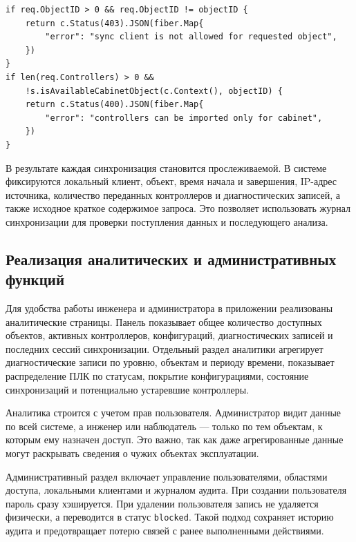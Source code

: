 \begin{samepage}
\begin{lstlisting}[caption={Фрагмент проверки локального клиента при импорте}, label={lst:chapter3_sync_check}]
if req.ObjectID > 0 && req.ObjectID != objectID {
    return c.Status(403).JSON(fiber.Map{
        "error": "sync client is not allowed for requested object",
    })
}
if len(req.Controllers) > 0 &&
    !s.isAvailableCabinetObject(c.Context(), objectID) {
    return c.Status(400).JSON(fiber.Map{
        "error": "controllers can be imported only for cabinet",
    })
}
\end{lstlisting}
\end{samepage}

В результате каждая синхронизация становится прослеживаемой. В системе фиксируются локальный клиент, объект, время начала и завершения, IP-адрес источника, количество переданных контроллеров и диагностических записей, а также исходное краткое содержимое запроса. Это позволяет использовать журнал синхронизации для проверки поступления данных и последующего анализа.


\subsection{Реализация аналитических и административных функций}

Для удобства работы инженера и администратора в приложении реализованы аналитические страницы. Панель показывает общее количество доступных объектов, активных контроллеров, конфигураций, диагностических записей и последних сессий синхронизации. Отдельный раздел аналитики агрегирует диагностические записи по уровню, объектам и периоду времени, показывает распределение ПЛК по статусам, покрытие конфигурациями, состояние синхронизаций и потенциально устаревшие контроллеры.

Аналитика строится с учетом прав пользователя. Администратор видит данные по всей системе, а инженер или наблюдатель --- только по тем объектам, к которым ему назначен доступ. Это важно, так как даже агрегированные данные могут раскрывать сведения о чужих объектах эксплуатации.

Административный раздел включает управление пользователями, областями доступа, локальными клиентами и журналом аудита. При создании пользователя пароль сразу хэшируется. При удалении пользователя запись не удаляется физически, а переводится в статус \texttt{blocked}. Такой подход сохраняет историю аудита и предотвращает потерю связей с ранее выполненными действиями.

